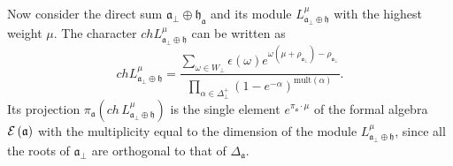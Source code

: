 \documentclass[a4paper,12pt]{article}
\theoremstyle{definition} \newtheorem{Def}{Definition}
\begin{document}
Now consider the direct sum $\mathfrak{a}_{\bot}\oplus\mathfrak{h}_{\mathfrak{a}}$ and its module $L^{\mu}_{\mathfrak{a}_{\bot}\oplus \mathfrak{h}}$
with the highest weight $\mu$. The character $ch L^{\mu}_{\mathfrak{a}_{\bot}\oplus \mathfrak{h}}$ can be written as
\begin{equation}
  \label{eq:41}
  ch L^{\mu}_{\mathfrak{a}_{\bot}\oplus \mathfrak{h}}= \frac{\sum_{\omega\in W_{\bot}} \epsilon(\omega) e^{\omega(\mu+\rho_{\mathfrak{a}_{\bot}})-\rho_{\mathfrak{a}_{\bot}}}}{\prod_{\alpha\in\Delta^{+}_{\bot}}(1-e^{-\alpha})^{\mathrm{mult}(\alpha)}}.
\end{equation}
Its projection $\pi_{\mathfrak{a}}(ch\, L^{\mu}_{\mathfrak{a}_{\bot}\oplus \mathfrak{h}})$ is the single element $e^{\pi_{\mathfrak{a}} \cdot\mu}$ of the formal algebra ${\cal E}\left( \mathfrak{a}\right)$ with the multiplicity equal to the dimension of the module $L^{\mu}_{\mathfrak{a}_{\bot}\oplus \mathfrak{h}}$, since all the roots of $\mathfrak{a}_{\bot}$ are orthogonal to  that of $\Delta_{\mathfrak{a}}$.
\end{document}
